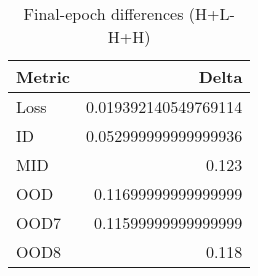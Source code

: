 \begin{table}[t]
\centering
\begin{tabular}{lr}
\hline
Metric & Delta \\
\hline
Loss & 0.019392140549769114 \\
ID & 0.052999999999999936 \\
MID & 0.123 \\
OOD & 0.11699999999999999 \\
OOD7 & 0.11599999999999999 \\
OOD8 & 0.118 \\
\hline
\end{tabular}
\caption{Final-epoch differences (H+L-H+H)}
\label{tab:diff}
\end{table}
